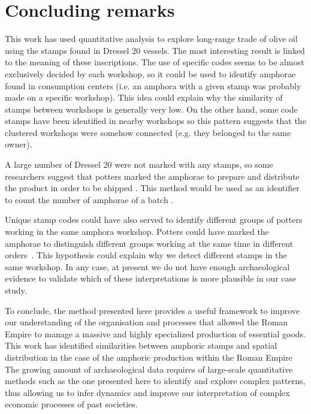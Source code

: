 \documentclass[review]{elsarticle}
\newcommand{\memo}[2]{\textcolor{#1}{#2}}
\newcommand{\xavi}[1]{\memo{magenta}{XRC: #1\\}}
\begin{document}
\section{Concluding remarks}

This work has used quantitative analysis to explore long-range trade of olive oil using the stamps found in Dressel 20 vessels. The most interesting result is linked to the meaning of these inscriptions. The use of specific codes seems to be almost exclusively decided by each workshop, so it could be used to identify amphorae found in consumption centers (i.e. an amphora with a given stamp was probably made on a specific workshop). This idea could explain why the similarity of stamps between workshops is generally very low. On the other hand, some code stamps have been identified in nearby workshops so this pattern suggests that the clustered workshops were somehow connected (e.g. they belonged to the same owner).



A large number of Dressel 20 were not marked with any stamps, so some researchers suggest that potters marked the amphorae to prepare and distribute the product in order to be shipped \citep{berni_millet_epigrafianforica_2008}. This method would be used as an identifier to count the number of amphorae of a batch \citep{juanmorostesis}. 

Unique stamp codes could have also served to identify different groups of potters working in the same amphora workshop. Potters could have marked the amphorae to distinguish different groups working at the same time in different orders~\citep{li_crossbows_2014}. This hypothesis could explain why we detect different stamps in the same workshop. In any case, at present we do not have enough archaeological evidence to validate which of these interpretations is more plausible in our case study.

To conclude, the method presented here provides a useful framework to improve our understanding of the organisation and processes that allowed the Roman Empire to manage a massive and highly specialized production of essential goods. This work has identified similarities between amphoric stamps and spatial distribution in the case of the amphoric production within the Roman Empire
The growing amount of archaeological data requires of large-scale quantitative methods such as the one presented here to identify and explore complex patterns, thus allowing us to infer dynamics and improve our interpretation of complex economic processes of past societies. 
\end{document}
